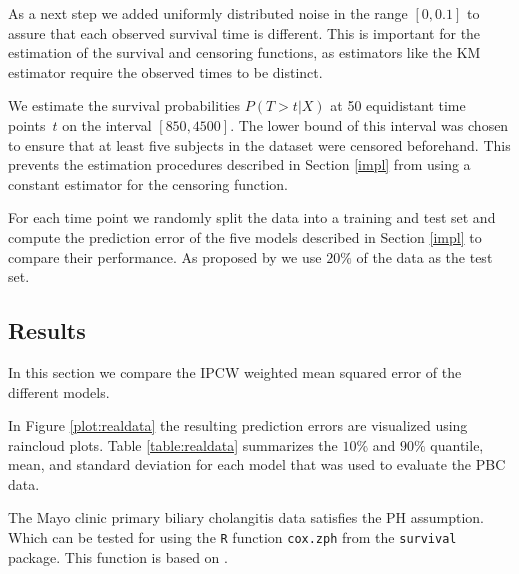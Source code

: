 \documentclass[12pt, a4paper]{scrartcl}
\theoremstyle{definition}
\theoremstyle{plain}
\numberwithin{equation}{section}
\numberwithin{figure}{section}
\numberwithin{table}{section}
\begin{document}
	As a next step we added uniformly distributed noise in the range $[0, 0.1]$ to assure that each observed survival time is different.
	This is important for the estimation of the survival and censoring functions, as estimators like the KM estimator require the observed times to be distinct.
	
	We estimate the survival probabilities $P(T > t \vert X)$ at 50 equidistant time points~$t$ on the interval $[850,4500]$.
	The lower bound of this interval was chosen to ensure that at least five subjects in the dataset were censored beforehand.
	This prevents the estimation procedures described in Section \ref{impl} from using a constant estimator for the censoring function.
	
	For each time point we randomly split the data into a training and test set and compute the prediction error of the five models described in Section \ref{impl} to compare their performance. 
	As proposed by \citet*{basearticle} we use $20\%$ of the data as the test set. 
	
	\subsection{Results}
	In this section we compare the IPCW weighted mean squared error of the different models.
	
	In Figure \ref{plot:realdata} the resulting prediction errors are visualized using raincloud plots.
	Table \ref{table:realdata} summarizes the $10\%$ and $90\%$ quantile, mean, and standard deviation for each model that was used to evaluate the PBC data.
	
	The Mayo clinic primary biliary cholangitis data satisfies the PH assumption.
	Which can be tested for using the \texttt{R} function \texttt{cox.zph} from the \texttt{survival} package.
	This function is based on \citet*{ph-test}.
	
\end{document}

